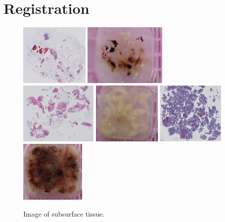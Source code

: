 \documentclass[a4paper,10pt,oneside]{article}
\begin{document}
\section{Registration}
\begin{figure}[hbtp]
	\centering
	\includegraphics[height=3cm]{images/PO13-00516A1_1_7_201305171148.png}
	\includegraphics[height=3cm]{images/PO1300516_A1.JPG} 
	\includegraphics[height=3cm]{images/PO14-00496A1Level1_1_2_201404181459.png} 
	\includegraphics[height=3cm]{images/PO1400496_A1.JPG} 
	\includegraphics[height=3cm]{images/PO14-00482B3_1_2_201404171123.png} 
	\includegraphics[height=3cm]{images/PO14004821_B3.JPG} 
	\caption{Image of subsurface tissue.}
	\label{fig:subsurface}
\end{figure}
\end{document}
